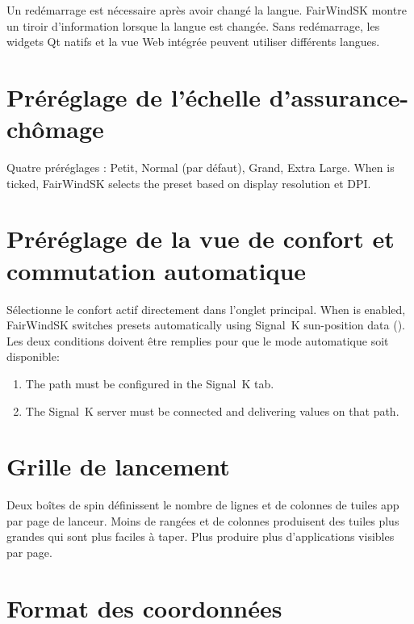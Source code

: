 \begin{warningbox}
Un redémarrage est nécessaire après avoir changé la langue.
FairWindSK montre un tiroir d'information lorsque la langue est changée.
Sans redémarrage, les widgets Qt natifs et la vue Web intégrée peuvent utiliser différents
langues.
\end{warningbox}

\section{Préréglage de l'échelle d'assurance-chômage}

Quatre préréglages : Petit, Normal (par défaut), Grand, Extra Large.
When  is ticked, FairWindSK selects the preset based on display resolution
et DPI.

\section{Préréglage de la vue de confort et commutation automatique}

Sélectionne le confort actif directement dans l'onglet principal.
When  is enabled, FairWindSK switches presets automatically
using Signal~K sun-position data ().
Les deux conditions doivent être remplies pour que le mode automatique soit disponible:

\begin{enumerate}
  \item The  path must be configured in the Signal~K tab.
  \item The Signal~K server must be connected and delivering values on that path.
\end{enumerate}

\section{Grille de lancement}

Deux boîtes de spin définissent le nombre de lignes et de colonnes de tuiles app par page de lanceur.
Moins de rangées et de colonnes produisent des tuiles plus grandes qui sont plus faciles à taper.
Plus produire plus d'applications visibles par page.

\section{Format des coordonnées}

